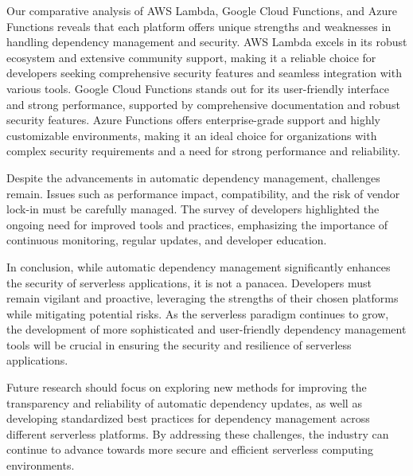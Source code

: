 \documentclass[sigconf]{acmart}
\begin{document}
Our comparative analysis of AWS Lambda, Google Cloud Functions, and Azure Functions reveals that each platform offers unique strengths and weaknesses in handling dependency management and security. AWS Lambda excels in its robust ecosystem and extensive community support, making it a reliable choice for developers seeking comprehensive security features and seamless integration with various tools. Google Cloud Functions stands out for its user-friendly interface and strong performance, supported by comprehensive documentation and robust security features. Azure Functions offers enterprise-grade support and highly customizable environments, making it an ideal choice for organizations with complex security requirements and a need for strong performance and reliability.

Despite the advancements in automatic dependency management, challenges remain. Issues such as performance impact, compatibility, and the risk of vendor lock-in must be carefully managed. The survey of developers highlighted the ongoing need for improved tools and practices, emphasizing the importance of continuous monitoring, regular updates, and developer education.

In conclusion, while automatic dependency management significantly enhances the security of serverless applications, it is not a panacea. Developers must remain vigilant and proactive, leveraging the strengths of their chosen platforms while mitigating potential risks. As the serverless paradigm continues to grow, the development of more sophisticated and user-friendly dependency management tools will be crucial in ensuring the security and resilience of serverless applications.

Future research should focus on exploring new methods for improving the transparency and reliability of automatic dependency updates, as well as developing standardized best practices for dependency management across different serverless platforms. By addressing these challenges, the industry can continue to advance towards more secure and efficient serverless computing environments.



\end{document}
